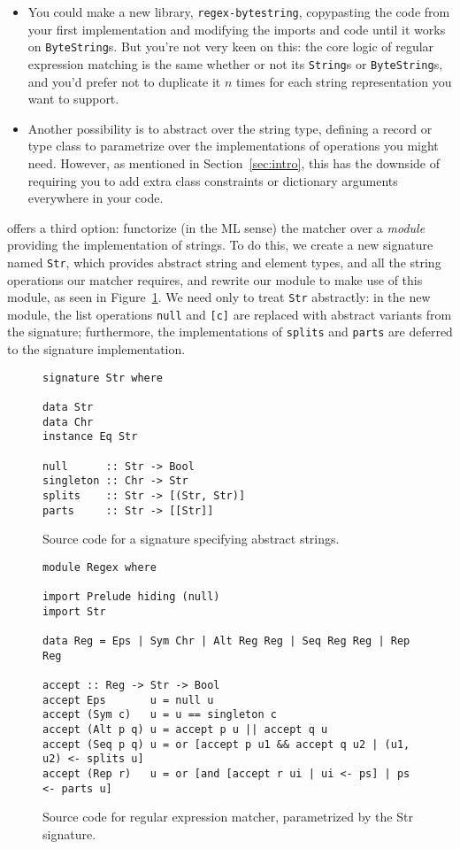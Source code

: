 \begin{itemize}
    \item You could make a new library, \verb|regex-bytestring|,
    copypasting the code from your first implementation and
    modifying the imports and code until it works on \verb|ByteString|s.
    But you're not very keen on this: the core logic of regular expression
    matching is the same whether or not its \verb|String|s or
    \verb|ByteString|s, and you'd prefer not to duplicate it $n$ times
    for each string representation you want to support.

    \item Another possibility is to abstract over the string type,
    defining a record or type class to parametrize over the implementations
    of operations you might need.  However, as mentioned in Section~\ref{sec:intro},
    this has the downside of requiring you to add extra class constraints
    or dictionary arguments everywhere in your code.
\end{itemize}
%
\Backpack{} offers a third option: functorize (in the ML sense) the matcher over a
\emph{module} providing the implementation of strings.  To do this, we
create a new signature named \verb|Str|, which provides abstract string
and element types, and all the string operations our matcher requires,
and rewrite our module to make use of this module, as seen in
Figure~\ref{fig:matcher-regex-indef-source}.  We need only to
treat \verb|Str| abstractly: in the new module, the list operations
\verb|null| and \verb|[c]| are replaced with abstract variants from the
signature; furthermore, the implementations of \verb|splits| and
\verb|parts| are deferred to the signature implementation.

\begin{figure}
\begin{lstlisting}
signature Str where

data Str
data Chr
instance Eq Str

null      :: Str -> Bool
singleton :: Chr -> Str
splits    :: Str -> [(Str, Str)]
parts     :: Str -> [[Str]]
\end{lstlisting}
\caption{Source code for a signature specifying abstract strings.}

\begin{lstlisting}
module Regex where

import Prelude hiding (null)
import Str

data Reg = Eps | Sym Chr | Alt Reg Reg | Seq Reg Reg | Rep Reg

accept :: Reg -> Str -> Bool
accept Eps       u = null u
accept (Sym c)   u = u == singleton c
accept (Alt p q) u = accept p u || accept q u
accept (Seq p q) u = or [accept p u1 && accept q u2 | (u1, u2) <- splits u]
accept (Rep r)   u = or [and [accept r ui | ui <- ps] | ps <- parts u]
\end{lstlisting}
\caption{Source code for regular expression matcher, parametrized by the Str signature.}
\label{fig:matcher-regex-indef-source}
\end{figure}

